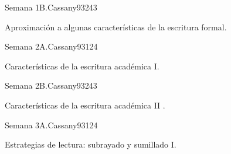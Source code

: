 \begin{syllabus}
\begin{unit}{Semana 1B.}{Cassany93}{24}{3}
   \begin{topics}
      \item Aproximación a algunas características de la escritura formal.
   \end{topics}

   \begin{learningoutcomes}
      \item 
      \item
      \item 
      \end{learningoutcomes}
\end{unit}

\begin{unit}{Semana 2A.}{Cassany93}{12}{4}
   \begin{topics}
      \item Características de la escritura académica I.
   \end{topics}
   \begin{learningoutcomes}
      \item 
   \end{learningoutcomes}
\end{unit}

\begin{unit}{Semana 2B.}{Cassany93}{24}{3}
   \begin{topics}
      \item Características de la escritura académica II .
   \end{topics}

   \begin{learningoutcomes}
      \item 
      \item
      \item 
      \end{learningoutcomes}
\end{unit}

\begin{unit}{Semana 3A.}{Cassany93}{12}{4}
   \begin{topics}
      \item Estrategias de lectura: subrayado y sumillado I.
   \end{topics}
   \begin{learningoutcomes}
      \item 
   \end{learningoutcomes}
\end{unit}


\end{syllabus}
